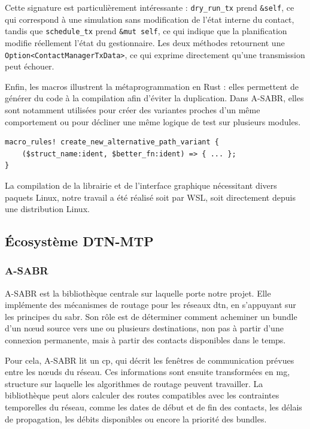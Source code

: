 \documentclass{article}
\begin{document}
Cette signature est particulièrement intéressante : \texttt{dry\_run\_tx} prend \texttt{\&self}, ce qui correspond à une simulation sans modification de l'état interne du contact, tandis que \texttt{schedule\_tx} prend \texttt{\&mut self}, ce qui indique que la planification modifie réellement l'état du gestionnaire. Les deux méthodes retournent une \texttt{Option<ContactManagerTxData>}, ce qui exprime directement qu'une transmission peut échouer.

Enfin, les macros illustrent la métaprogrammation en Rust : elles permettent de générer du code à la compilation afin d'éviter la duplication. Dans A-SABR, elles sont notamment utilisées pour créer des variantes proches d'un même comportement ou pour décliner une même logique de test sur plusieurs modules.

\begin{verbatim}
macro_rules! create_new_alternative_path_variant {
    ($struct_name:ident, $better_fn:ident) => { ... };
}
\end{verbatim}

La compilation de la librairie et de l'interface graphique nécessitant divers paquets Linux, notre travail a été 
réalisé soit par WSL, soit directement depuis une distribution Linux.

\subsection{Écosystème DTN-MTP}
\subsubsection{A-SABR}
A-SABR est la bibliothèque centrale sur laquelle porte notre projet. Elle implémente des mécanismes de routage pour les réseaux \gls{dtn}, en s’appuyant sur les principes du \gls{sabr}. Son rôle est de déterminer comment acheminer un \gls{bundle} d’un nœud source vers une ou plusieurs destinations, non pas à partir d’une connexion permanente, mais à partir des contacts disponibles dans le temps.

Pour cela, A-SABR lit un \gls{cp}, qui décrit les fenêtres de communication prévues entre les nœuds du réseau. Ces informations sont ensuite transformées en \gls{mg}, structure sur laquelle les algorithmes de routage peuvent travailler. La bibliothèque peut alors calculer des routes compatibles avec les contraintes temporelles du réseau, comme les dates de début et de fin des contacts, les délais de propagation, les débits disponibles ou encore la priorité des bundles.
\end{document}
